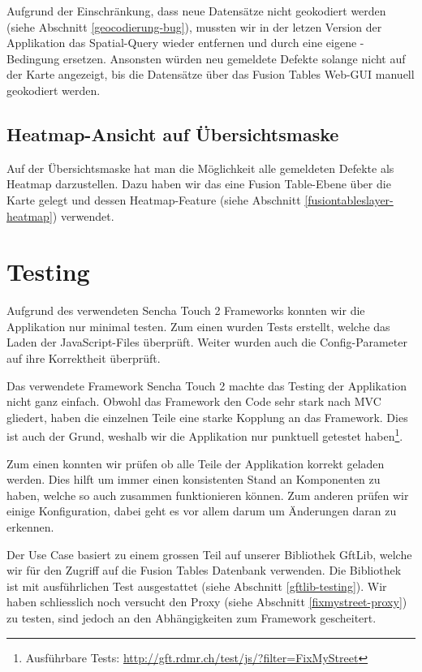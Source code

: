 Aufgrund der Einschränkung, dass neue Datensätze nicht geokodiert werden (siehe Abschnitt \ref{geocodierung-bug}), mussten wir in der letzen Version der Applikation das Spatial-Query wieder entfernen und durch eine eigene -Bedingung ersetzen. Ansonsten würden neu gemeldete Defekte solange nicht auf der Karte angezeigt, bis die Datensätze über das Fusion Tables Web-GUI manuell geokodiert werden.

\subsection{Heatmap-Ansicht auf Übersichtsmaske}
\label{fixmystreet-heatmap}
Auf der Übersichtsmaske hat man die Möglichkeit alle gemeldeten Defekte als Heatmap darzustellen. Dazu haben wir das eine Fusion Table-Ebene über die Karte gelegt und dessen Heatmap-Feature (siehe Abschnitt \ref{fusiontableslayer-heatmap}) verwendet. 

\section{Testing}
Aufgrund des verwendeten Sencha Touch 2 Frameworks konnten wir die Applikation nur minimal testen. Zum einen wurden Tests erstellt, welche das Laden der JavaScript-Files überprüft. Weiter wurden auch die Config-Parameter auf ihre Korrektheit überprüft.

Das verwendete Framework Sencha Touch 2 machte das Testing der Applikation nicht ganz einfach. Obwohl das Framework den Code sehr stark nach MVC gliedert, haben die einzelnen Teile eine starke Kopplung an das Framework. Dies ist auch der Grund, weshalb wir die Applikation nur punktuell getestet haben\footnote{Ausführbare Tests: \url{http://gft.rdmr.ch/test/js/?filter=FixMyStreet}}.

Zum einen konnten wir prüfen ob alle Teile der Applikation korrekt geladen werden. Dies hilft um immer einen konsistenten Stand an Komponenten zu haben, welche so auch zusammen funktionieren können. Zum anderen prüfen wir einige Konfiguration, dabei geht es vor allem darum um Änderungen daran zu erkennen.

Der Use Case basiert zu einem grossen Teil auf unserer Bibliothek GftLib, welche wir für den Zugriff auf die Fusion Tables Datenbank verwenden. Die Bibliothek ist mit ausführlichen Test ausgestattet (siehe Abschnitt \ref{gftlib-testing}). Wir haben schliesslich noch versucht den Proxy (siehe Abschnitt \ref{fixmystreet-proxy}) zu testen, sind jedoch an den Abhängigkeiten zum Framework gescheitert.

